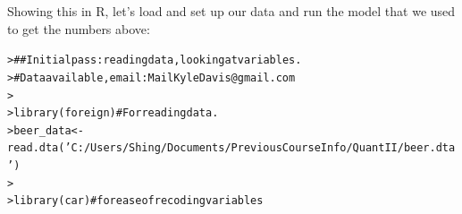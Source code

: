 \documentclass[12pt]{article}\usepackage[]{graphicx}\usepackage[]{color}
\makeatletter
\newcommand{\hlstr}[1]{\textcolor[rgb]{0.82,0.78,0.62}{#1}}%
\newcommand{\hlcom}[1]{\textcolor[rgb]{0.404,0.408,0.42}{#1}}%
\newcommand{\hlstd}[1]{\textcolor[rgb]{0.882,0.878,0.898}{#1}}%
\newcommand{\hlkwb}[1]{\textcolor[rgb]{0.902,0.675,0.196}{#1}}%
\newcommand{\hlkwd}[1]{\textcolor[rgb]{0.733,0.388,0.812}{#1}}%
\newenvironment{kframe}{%
 \def\at@end@of@kframe{}%
 \ifinner\ifhmode%
  \def\at@end@of@kframe{\end{minipage}}%
  \begin{minipage}{\columnwidth}%
 \fi\fi%
 \def\FrameCommand##1{\hskip\@totalleftmargin \hskip-\fboxsep
 \colorbox{shadecolor}{##1}\hskip-\fboxsep
     \hskip-\linewidth \hskip-\@totalleftmargin \hskip\columnwidth}%
 \MakeFramed {\advance\hsize-\width
   \@totalleftmargin\z@ \linewidth\hsize
   \@setminipage}}%
 {\par\unskip\endMakeFramed%
 \at@end@of@kframe}
\newenvironment{knitrout}{}{} %
\makeatother
\begin{document}
\begin{flushleft}
\clearpage
\noindent Showing this in R, let's load and set up our data and run the model that we used to get the numbers above:  
\begin{knitrout}
\color{fgcolor}\begin{kframe}
\begin{alltt}
\hlstd{> }\hlcom{## Initial pass: reading data, looking at variables.}
\hlstd{> }\hlcom{# Data available, email: MailKyleDavis@gmail.com}
\hlstd{> }
\hlstd{> }\hlkwd{library}\hlstd{(foreign)} \hlcom{# For reading data.}
\hlstd{> }\hlstd{beer_data} \hlkwb{<-} \hlkwd{read.dta}\hlstd{(}\hlstr{'C:/Users/Shing/Documents/Previous Course Info/Quant II/beer.dta'}\hlstd{)}
\hlstd{> }
\hlstd{> }\hlkwd{library}\hlstd{(car)} \hlcom{# for ease of recoding variables}
\end{alltt}



\end{kframe}
\end{knitrout}
\end{flushleft}
\end{document}
